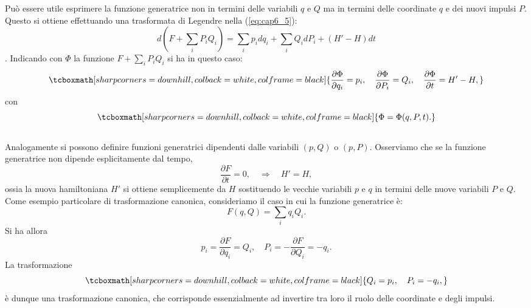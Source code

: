Pu\`o essere utile esprimere la funzione generatrice non in termini delle variabili $q$ e $Q$ ma in termini delle coordinate $q$ e dei nuovi impulsi $P$. Questo si ottiene effettuando una trasformata di Legendre nella (\ref{eq:cap6_5}):
	\begin{equation}
		d(F+\sum_i P_iQ_i) = \sum_i p_i dq_i + \sum_i Q_i dP_i + (H'-H)dt
	\end{equation}.
Indicando con $\Phi$ la funzione $F+\sum_iP_i Q_i $ si ha in questo caso:
	\begin{equation}
		\tcboxmath[sharp corners=downhill, colback=white, colframe=black]{
			\frac{\partial \Phi}{\partial q_i} = p_i , \quad \frac{\partial \Phi}{\partial P_i} = Q_i , \quad \frac{\partial \Phi}{\partial t} = H'- H ,
			}
		\label{eq:cap6_6}
	\end{equation}
con
	\begin{equation}
		\tcboxmath[sharp corners=downhill, colback=white, colframe=black]{
			\Phi = \Phi (q,P,t) .
			}
	\end{equation}\\
	
Analogamente si possono definire funzioni generatrici dipendenti dalle variabili $(p,Q)$ o $(p,P)$. Osserviamo che se la funzione generatrice non dipende esplicitamente dal tempo,
	\begin{equation}
		\frac{\partial F}{\partial t} = 0 , \quad \Rightarrow \quad H' = H ,
	\end{equation}
ossia la nuova hamiltoniana $H'$ si ottiene semplicemente da $H$ sostituendo le vecchie variabili $p$ e $q$ in termini delle nuove variabili $P$ e $Q$.\\

Come esempio particolare di trasformazione canonica, consideriamo il caso in cui la funzione generatrice \`e:
	\begin{equation}
		F(q,Q) = \sum_i q_i Q_i .
	\end{equation}
Si ha allora
	\begin{equation}
		p_i = \frac{\partial F}{\partial q_i} = Q_i , \quad P_i = - \frac{\partial F}{\partial Q_i} = -q_i .
	\end{equation}
La trasformazione
	\begin{equation}
		\tcboxmath[sharp corners=downhill, colback=white, colframe=black]{
			Q_i = p_i  , \quad P_i = -q_i ,
			}
	\end{equation}
\`e dunque una trasformazione canonica, che corrisponde essenzialmente ad invertire tra loro il ruolo delle coordinate e degli impulsi.

